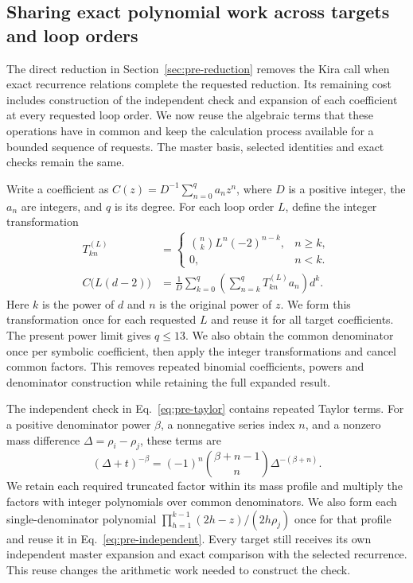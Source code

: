 \subsection{Sharing exact polynomial work across targets and loop orders}
\label{sec:polynomial-reuse}
The direct reduction in Section~\ref{sec:pre-reduction} removes the Kira
call when exact recurrence relations complete the requested reduction.
Its remaining cost includes construction of the independent check and
expansion of each coefficient at every requested loop order. We now reuse
the algebraic terms that these operations have in common and keep the
calculation process available for a bounded sequence of requests.
The master basis, selected identities and exact checks remain the same.

Write a coefficient as
\(C(z)=D^{-1}\sum_{n=0}^{q}a_nz^n\), where \(D\) is a positive integer,
the \(a_n\) are integers, and \(q\) is its degree. For each loop order
\(L\), define the integer transformation
\begin{equation}
 \begin{aligned}
 T^{(L)}_{kn}&=
 \begin{cases}
 \displaystyle\binom{n}{k}L^n(-2)^{n-k},& n\geq k,\\
 0,& n<k.
 \end{cases}
 \\[4pt]
 C\bigl(L(d-2)\bigr)&=\frac{1}{D}
 \sum_{k=0}^{q}\left(\sum_{n=k}^{q}T^{(L)}_{kn}a_n\right)d^k.
 \end{aligned}
 \label{eq:reuse-transform}
\end{equation}
Here \(k\) is the power of \(d\) and \(n\) is the original power of \(z\).
We form this transformation once for each requested \(L\) and reuse it
for all target coefficients. The present power limit gives \(q\leq13\).
We also obtain the common denominator once per symbolic coefficient,
then apply the integer transformations and cancel common factors.
This removes repeated binomial coefficients, powers and denominator
construction while retaining the full expanded result.

The independent check in Eq.~\eqref{eq:pre-taylor} contains repeated
Taylor terms. For a positive denominator power \(\beta\), a nonnegative
series index \(n\), and a nonzero mass difference
\(\Delta=\rho_i-\rho_j\), these terms are
\begin{equation}
 [t^n](\Delta+t)^{-\beta}
 =(-1)^n\binom{\beta+n-1}{n}\Delta^{-(\beta+n)}.
 \label{eq:reuse-taylor}
\end{equation}
We retain each required truncated factor within its mass profile and
multiply the factors with integer polynomials over common denominators.
We also form each single-denominator polynomial
\(\prod_{h=1}^{k-1}(2h-z)/(2h\rho_j)\) once for that profile and reuse it
in Eq.~\eqref{eq:pre-independent}. Every target still receives its own
independent master expansion and exact comparison with the selected
recurrence. This reuse changes the arithmetic work needed to construct
the check.

